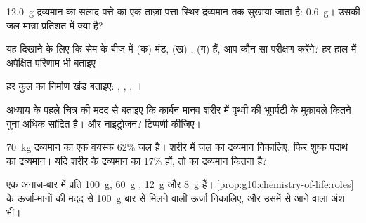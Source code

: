 \begin{exercise}[$\star$]\label{exo:g10:chemistry-of-life:3}
\qty{12.0}{g} द्रव्यमान का सलाद-पत्ते का एक ताज़ा पत्ता स्थिर द्रव्यमान
तक सुखाया जाता है: \qty{0.6}{g}। उसकी जल-मात्रा प्रतिशत में क्या है?
\end{exercise}

\begin{exercise}[$\star$]\label{exo:g10:chemistry-of-life:4}
यह दिखाने के लिए कि सेम के बीज में (क) मंड, (ख) , (ग)  हैं,
आप कौन-सा परीक्षण करेंगे? हर हाल में अपेक्षित परिणाम भी बताइए।
\end{exercise}

\begin{exercise}[$\star$]\label{exo:g10:chemistry-of-life:5}
हर कुल का निर्माण खंड बताइए: , , , ।
\end{exercise}

\begin{exercise}[$\star\star$]\label{exo:g10:chemistry-of-life:6}
अध्याय के पहले चित्र की मदद से बताइए कि कार्बन मानव शरीर में पृथ्वी की
भूपर्पटी के मुक़ाबले कितने गुना अधिक सांद्रित है। और नाइट्रोजन? टिप्पणी
कीजिए।
\end{exercise}

\begin{exercise}[$\star\star$]\label{exo:g10:chemistry-of-life:7}
\qty{70}{kg} द्रव्यमान का एक वयस्क 62\% जल है। शरीर में जल का द्रव्यमान
निकालिए, फिर शुष्क पदार्थ का द्रव्यमान। यदि  शरीर के द्रव्यमान का
17\% हों, तो  का द्रव्यमान कितना है?
\end{exercise}

\begin{exercise}[$\star\star$]\label{exo:g10:chemistry-of-life:8}
एक अनाज-बार में प्रति \qty{100}{g}, \qty{60}{g} ,
\qty{12}{g}  और \qty{8}{g}  हैं।
\cref{prop:g10:chemistry-of-life:roles} के ऊर्जा-मानों की मदद से
\qty{100}{g} बार से मिलने वाली ऊर्जा निकालिए, और उसमें  से आने वाला
अंश भी।
\end{exercise}

